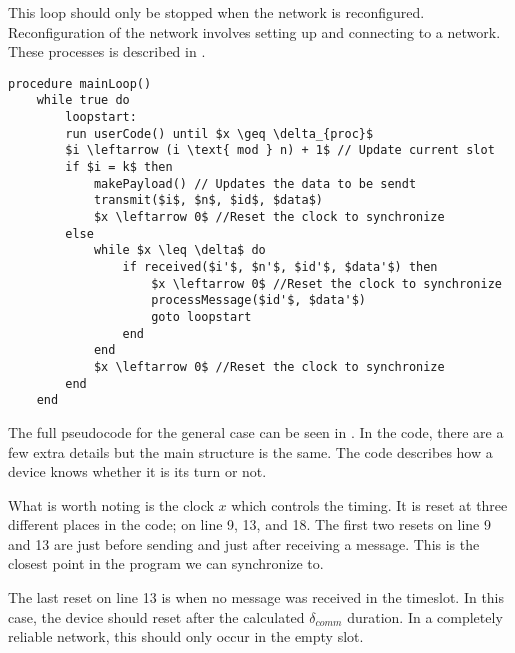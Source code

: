 
This loop should only be stopped when the network is reconfigured. 
Reconfiguration of the network involves setting up and connecting to a network. 
These processes is described in .

\begin{minipage}{\linewidth} %
\begin{lstlisting}[style=pseudocode,mathescape=true, label={lst:general_case}, caption={Pseudocode example of the main loop}] 
procedure mainLoop()
    while true do
        loopstart:
        run userCode() until $x \geq \delta_{proc}$
        $i \leftarrow (i \text{ mod } n) + 1$ // Update current slot
        if $i = k$ then
            makePayload() // Updates the data to be sendt
            transmit($i$, $n$, $id$, $data$)
            $x \leftarrow 0$ //Reset the clock to synchronize
        else
            while $x \leq \delta$ do
                if received($i'$, $n'$, $id'$, $data'$) then
                    $x \leftarrow 0$ //Reset the clock to synchronize
                    processMessage($id'$, $data'$)
                    goto loopstart
                end
            end
            $x \leftarrow 0$ //Reset the clock to synchronize
        end
    end
\end{lstlisting}  
\end{minipage}

The full pseudocode for the general case can be seen in . 
In the code, there are a few extra details but the main structure is the same. 
The code describes how a device knows whether it is its turn or not. 

What is worth noting is the clock $x$ which controls the timing. 
It is reset at three different places in the code; on line 9, 13, and 18. 
The first two resets on line 9 and 13 are just before sending and just after receiving a message. 
This is the closest point in the program we can synchronize to. 

The last reset on line 13 is when no message was received in the timeslot. 
In this case, the device should reset after the calculated $\delta_{comm}$ duration. 
In a completely reliable network, this should only occur in the empty slot.

            
